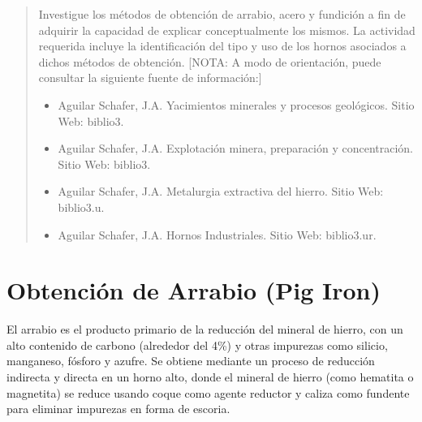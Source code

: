 \documentclass[12pt,a4paper]{article}
\begin{document}

\newpage
\tableofcontents

\begin{abstract}
    Investigue los métodos de obtención de arrabio, acero y fundición a fin de adquirir la capacidad de explicar conceptualmente los mismos. La actividad requerida incluye la identificación del tipo y uso de los hornos asociados a dichos métodos de obtención. [NOTA: A modo de orientación, puede consultar la siguiente fuente de información:]
    \begin{itemize}
        \item Aguilar Schafer, J.A. Yacimientos minerales y procesos geológicos. Sitio Web: biblio3.
        \item Aguilar Schafer, J.A. Explotación minera, preparación y concentración. Sitio Web: biblio3.
        \item Aguilar Schafer, J.A. Metalurgia extractiva del hierro. Sitio Web: biblio3.u.
        \item Aguilar Schafer, J.A. Hornos Industriales. Sitio Web: biblio3.ur.
    \end{itemize}
\end{abstract}

\section{Obtención de Arrabio (Pig Iron)}
El arrabio es el producto primario de la reducción del mineral de hierro, con un alto contenido de carbono (alrededor del 4\%) y otras impurezas como silicio, manganeso, fósforo y azufre. Se obtiene mediante un proceso de reducción indirecta y directa en un horno alto, donde el mineral de hierro (como hematita o magnetita) se reduce usando coque como agente reductor y caliza como fundente para eliminar impurezas en forma de escoria.
\end{document}
